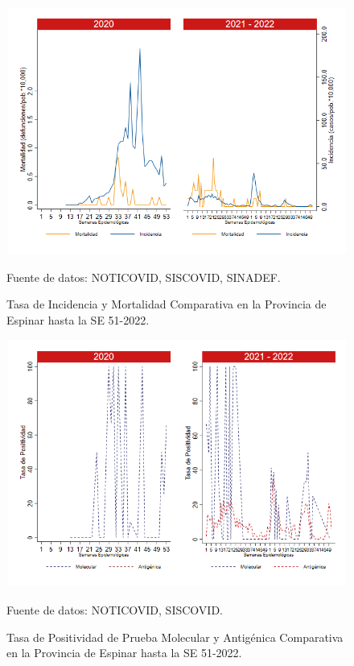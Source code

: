 \documentclass[12pt,a4paper,openany]{book}
\begin{document}
	\begin{figure}[h]
		\caption{Tasa de Incidencia y Mortalidad Comparativa en la Provincia de Espinar hasta la SE 51-2022.}\label{fig:inc_mort_espinar}
		\begin{center}
			\includegraphics[width=0.85\linewidth]{../figuras/incidencia_mortalidad_20_21_8.png}
		\end{center}
		{\footnotesize {Fuente de datos: NOTICOVID, SISCOVID, SINADEF.}}
	\end{figure}
	
	\begin{figure}[h]
		\caption{Tasa de Positividad de Prueba Molecular y Antigénica Comparativa en la Provincia de Espinar hasta la SE 51-2022.}\label{fig:positividad_espinar}
		\begin{center}
			\includegraphics[width=0.7\linewidth]{../figuras/positividad_20_21_8.png}
		\end{center}
		{\footnotesize {Fuente de datos: NOTICOVID, SISCOVID.}}
	\end{figure}
	
\end{document}
